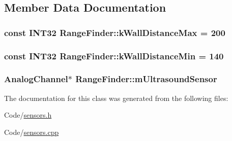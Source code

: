 \subsection{\-Member \-Data \-Documentation}
\hypertarget{class_range_finder_aa95ad17f79c12890881b881339bf9768}{
\subsubsection[{k\-Wall\-Distance\-Max}]{\setlength{\rightskip}{0pt plus 5cm}const \-I\-N\-T32 {\bf \-Range\-Finder\-::k\-Wall\-Distance\-Max} = 200}}\label{class_range_finder_aa95ad17f79c12890881b881339bf9768}
\hypertarget{class_range_finder_aede996e16ed0cfafc6013e12aabdf03a}{
\subsubsection[{k\-Wall\-Distance\-Min}]{\setlength{\rightskip}{0pt plus 5cm}const \-I\-N\-T32 {\bf \-Range\-Finder\-::k\-Wall\-Distance\-Min} = 140}}\label{class_range_finder_aede996e16ed0cfafc6013e12aabdf03a}
\hypertarget{class_range_finder_ac2d9d3c890c0997830f28d39c135b5d5}{
\subsubsection[{m\-Ultrasound\-Sensor}]{\setlength{\rightskip}{0pt plus 5cm}\-Analog\-Channel$\ast$ {\bf \-Range\-Finder\-::m\-Ultrasound\-Sensor}}}\label{class_range_finder_ac2d9d3c890c0997830f28d39c135b5d5}


\-The documentation for this class was generated from the following files\-:\begin{DoxyCompactItemize}
\item 
\-Code/\hyperlink{sensors_8h}{sensors.\-h}\item 
\-Code/\hyperlink{sensors_8cpp}{sensors.\-cpp}\end{DoxyCompactItemize}
